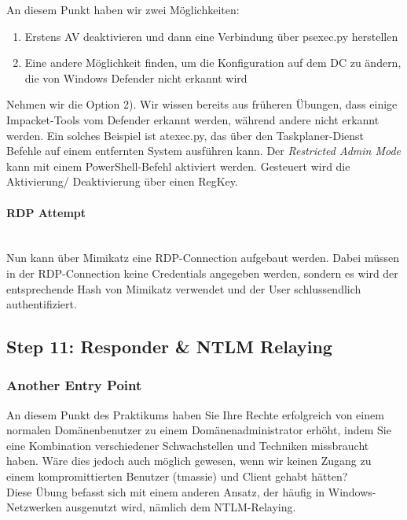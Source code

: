 An diesem Punkt haben wir zwei Möglichkeiten:\\
\begin{enumerate}
    \item Erstens AV deaktivieren und dann eine Verbindung über psexec.py herstellen
    \item Eine andere Möglichkeit finden, um die Konfiguration auf dem DC zu ändern, die von Windows Defender nicht erkannt wird\\
\end{enumerate}

Nehmen wir die Option 2). Wir wissen bereits aus früheren Übungen, dass einige Impacket-Tools vom Defender erkannt werden, während andere nicht erkannt werden. Ein solches Beispiel ist atexec.py, das über den Taskplaner-Dienst Befehle auf einem entfernten System ausführen kann.
Der \textcolor{OSTPink}{\textit{Restricted Admin Mode}} kann mit einem PowerShell-Befehl aktiviert werden. Gesteuert wird die Aktivierung/ Deaktivierung über einen RegKey.

\paragraph{RDP Attempt}\mbox{} \\
Nun kann über Mimikatz eine RDP-Connection aufgebaut werden. Dabei müssen in der RDP-Connection keine Credentials angegeben werden, sondern es wird der entsprechende Hash von Mimikatz verwendet und der User schlussendlich authentifiziert.

\newpage

\subsection{Step 11: Responder \& NTLM Relaying}

\subsubsection{Another Entry Point}
An diesem Punkt des Praktikums haben Sie Ihre Rechte erfolgreich von einem normalen Domänenbenutzer zu einem Domänenadministrator erhöht, indem Sie eine Kombination verschiedener Schwachstellen und Techniken missbraucht haben. Wäre dies jedoch auch möglich gewesen, wenn wir keinen Zugang zu einem kompromittierten Benutzer (tmassie) und Client gehabt hätten?\\

Diese Übung befasst sich mit einem anderen Ansatz, der häufig in Windows-Netzwerken ausgenutzt wird, nämlich dem NTLM-Relaying.\\

